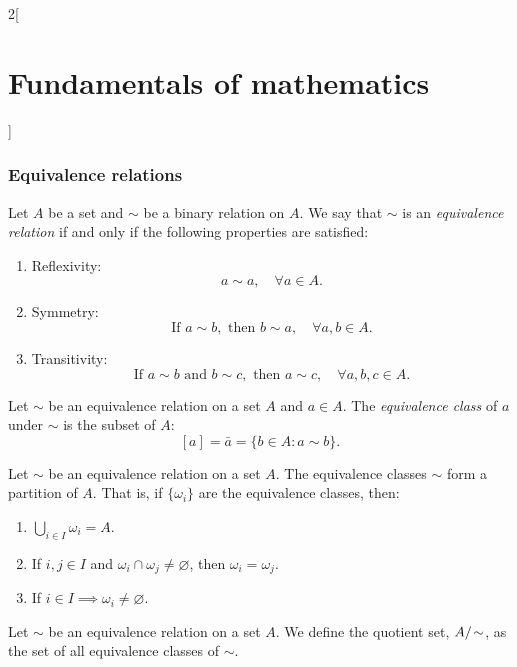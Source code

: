 \documentclass[../../../main.tex]{subfiles}
\begin{document}
\begin{multicols}{2}[\section{Fundamentals of mathematics}]
  \subsubsection{Equivalence relations}
  \begin{definition}
    Let $A$ be a set and $\sim$ be a binary relation on $A$. We say that $\sim$ is an \emph{equivalence relation} if and only if the following properties are satisfied:
    \begin{enumerate}
      \item Reflexivity: $$a\sim a,\quad\forall a\in A.$$
      \item Symmetry: $$\text{If }a\sim b, \text{ then }b\sim a,\quad\forall a,b\in A.$$
      \item Transitivity:
            $$\text{If }a\sim b\text{ and }b\sim c,\text{ then }a\sim c,\quad\forall a,b,c\in A.$$
    \end{enumerate}
  \end{definition}
  \begin{definition}
    Let $\sim$ be an equivalence relation on a set $A$ and $a\in A$. The \emph{equivalence class} of $a$ under $\sim$ is the subset of $A$: $$[a]=\bar{a}=\{b\in A: a\sim b\}.$$
  \end{definition}
  \begin{theorem}
    Let $\sim$ be an equivalence relation on a set $A$. The equivalence classes $\sim$ form a partition of $A$. That is, if $\{\omega_i\}$ are the equivalence classes, then:
    \begin{enumerate}
      \item $\bigcup_{i\in I} \omega_i=A$.
      \item If $i,j\in I$ and $\omega_i\cap\omega_j\ne\varnothing$, then $\omega_i=\omega_j$.
      \item If $i\in I\implies\omega_i\ne\varnothing$.
    \end{enumerate}
  \end{theorem}
  \begin{definition}
    Let $\sim$ be an equivalence relation on a set $A$. We define the quotient set, $\quot{A}{\!\sim}$, as the set of all equivalence classes of $\sim$.
  \end{definition}

\end{multicols}
\end{document}
